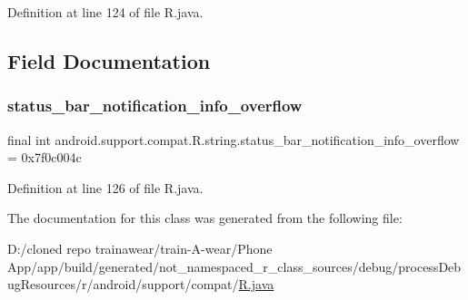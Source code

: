 Definition at line 124 of file R.\+java.


\begin{DoxyCode}{0}

\end{DoxyCode}


\subsection{Field Documentation}
\mbox{\label{classandroid_1_1support_1_1compat_1_1_r_1_1string_a7529efba925b9ba0a8d7ae1cab99f9db}} 
\subsubsection{\texorpdfstring{status\_bar\_notification\_info\_overflow}{status\_bar\_notification\_info\_overflow}}
{\footnotesize\ttfamily final int android.\+support.\+compat.\+R.\+string.\+status\+\_\+bar\+\_\+notification\+\_\+info\+\_\+overflow = 0x7f0c004c\hspace{0.3cm}{\ttfamily [static]}}



Definition at line 126 of file R.\+java.



The documentation for this class was generated from the following file\+:\begin{DoxyCompactItemize}
\item 
D\+:/cloned repo trainawear/train-\/\+A-\/wear/\+Phone App/app/build/generated/not\+\_\+namespaced\+\_\+r\+\_\+class\+\_\+sources/debug/process\+Debug\+Resources/r/android/support/compat/\mbox{\hyperlink{process_debug_resources_2r_2android_2support_2compat_2_r_8java}{R.\+java}}\end{DoxyCompactItemize}
